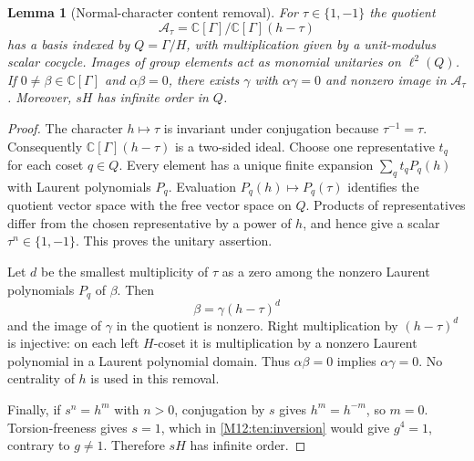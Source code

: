 \documentclass[11pt,a4paper,oneside]{report}
\newtheorem{lemma}[theorem]{Lemma}
\theoremstyle{definition}
\theoremstyle{remark}
\begin{document}
\begin{lemma}[Normal-character content removal]\label{M12:ten:normal-content}
For $\tau\in\{1,-1\}$ the quotient
\[
\mathcal A_\tau=
\mathbb C[\Gamma]/\mathbb C[\Gamma](h-\tau)
\]
has a basis indexed by $Q=\Gamma/H$, with multiplication given by a
unit-modulus scalar cocycle. Images of group elements act as monomial
unitaries on $\ell^2(Q)$.
If $0\ne\beta\in\mathbb C[\Gamma]$ and $\alpha\beta=0$, there
exists $\gamma$ with $\alpha\gamma=0$ and nonzero image in
$\mathcal A_\tau$.
Moreover, $sH$ has infinite order in $Q$.
\end{lemma}
\begin{proof}
The character $h\mapsto\tau$ is invariant under conjugation because
$\tau^{-1}=\tau$. Consequently
$\mathbb C[\Gamma](h-\tau)$ is a two-sided ideal. Choose one
representative $t_q$ for each coset $q\in Q$. Every element has a
unique finite expansion $\sum_q t_qP_q(h)$ with Laurent polynomials
$P_q$. Evaluation $P_q(h)\mapsto P_q(\tau)$ identifies the quotient
vector space with the free vector space on $Q$. Products of
representatives differ from the chosen representative by a power of
$h$, and hence give a scalar $\tau^n\in\{1,-1\}$. This proves the
unitary assertion.

Let $d$ be the smallest multiplicity of $\tau$ as a zero among the
nonzero Laurent polynomials $P_q$ of $\beta$. Then
\[
\beta=\gamma(h-\tau)^d
\]
and the image of $\gamma$ in the quotient is nonzero. Right
multiplication by $(h-\tau)^d$ is injective: on each left $H$-coset
it is multiplication by a nonzero Laurent polynomial in a Laurent
polynomial domain. Thus $\alpha\beta=0$ implies
$\alpha\gamma=0$. No centrality of $h$ is used in this removal.

Finally, if $s^n=h^m$ with $n>0$, conjugation by $s$ gives
$h^m=h^{-m}$, so $m=0$. Torsion-freeness gives $s=1$, which in
\eqref{M12:ten:inversion} would give $g^4=1$, contrary to $g\ne1$.
Therefore $sH$ has infinite order.
\end{proof}
\end{document}
